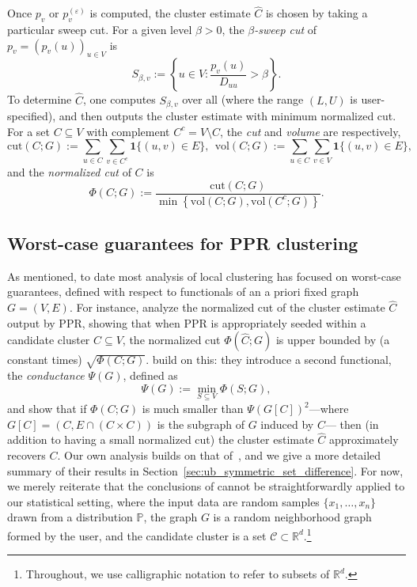 \documentclass[11pt,twoside]{article}
\newcommand{\Reals}{\mathbb{R}}
\newcommand{\set}[1]{\left\{#1\right\}}
\newcommand{\1}{\mathbf{1}}
\newcommand{\Rd}{\Reals^d}
\newcommand{\mc}[1]{\mathcal{#1}}
\newcommand{\wh}[1]{\widehat{#1}}
\newcommand{\vol}{\mathrm{vol}}
\newcommand{\cut}{\mathrm{cut}}
\begin{document}
Once $p_v$ or $p_v^{(\varepsilon)}$ is computed, the cluster estimate $\wh{C}$ is chosen by taking a particular sweep cut. For a given level $\beta > 0$, the \emph{$\beta$-sweep cut} of $p_v = (p_v(u))_{u \in V}$ is 
\begin{equation}
\label{eqn:sweep_cuts}
S_{\beta,v} := \set{u \in V: \frac{p_v(u)}{D_{uu}} > \beta}.
\end{equation}
To determine $\wh{C}$, one computes $S_{\beta,v}$ over all  (where the range $(L,U)$ is user-specified), and then outputs the cluster estimate
\smash{$\wh{C} = S_{\beta^*,v}$} with minimum normalized cut. For a set $C \subseteq V$ with complement $C^c = V \!\setminus\! C$, the \emph{cut} and \emph{volume} are respectively,
\begin{equation}
\label{eqn:cut_volume}
\cut(C;G) := \sum_{u \in C} \sum_{v \in C^c}
\1\{(u,v) \in E\},~~ \vol(C; G) := \sum_{u \in C}  \sum_{v \in V} \1\{(u,v) \in E\},
\end{equation}
and the \emph{normalized cut} of $C$ is
\begin{equation}
\label{eqn:normalized_cut}
\Phi(C; G) := \frac{\cut(C;G)}{\min \set{\vol(C; G), \vol(C^c; G)}}.
\end{equation} 

\subsection{Worst-case guarantees for PPR clustering}
As mentioned, to date most analysis of local clustering has focused on worst-case guarantees, defined with respect to functionals of an a priori fixed graph $G = (V,E)$.  For instance, \cite{andersen2006} analyze the normalized cut of the cluster estimate $\wh{C}$ output by PPR, showing that when PPR is appropriately seeded within a candidate cluster $C \subseteq V$, the normalized cut $\Phi(\wh{C};G)$ is upper bounded by (a constant times)  $\sqrt{\Phi(C;G)}$. \cite{zhu2013} build on this: they introduce a second functional, the \emph{conductance} $\Psi(G)$, defined as 
\begin{equation}
\label{eqn:conductance}
\Psi(G) := \min_{S \subseteq V} \Phi(S;G),
\end{equation}
and show that if $\Phi(C;G)$ is much smaller than $\Psi(G[C])^2$---where $G[C] = (C,E \cap (C \times C))$ is the subgraph of $G$ induced by $C$--- then (in addition to having a small normalized cut) the cluster estimate $\wh{C}$ approximately recovers $C$. Our own analysis builds on that of~\cite{zhu2013}, and we give a more detailed summary of their results in Section~\ref{sec:ub_symmetric_set_difference}.
For now, we merely reiterate that the conclusions of \citet{andersen2006,zhu2013} cannot be straightforwardly applied to our statistical setting, where the input data are random samples $\{x_1,\ldots,x_n\}$ drawn from a distribution $\mathbb{P}$, the graph $G$ is a random neighborhood graph formed by the user, and the candidate cluster is a set $\mc{C} \subset \Rd$.\footnote{Throughout, we use calligraphic notation to refer to subsets of $\Rd$.}
\end{document}
